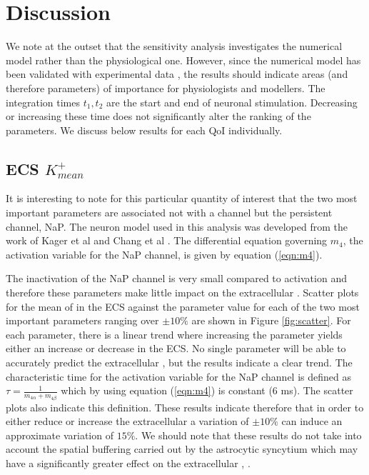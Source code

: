 \section{Discussion}
We  note at the outset that the sensitivity analysis investigates the numerical model rather than the physiological one. However, since the numerical model has been validated with experimental data  \cite{Dormanns2015,Mathias2018},  the results should indicate areas (and therefore parameters) of importance for physiologists and modellers. The integration times $t_1,t_2$ are the start and end of neuronal stimulation. Decreasing or increasing these time does not significantly alter the ranking of the parameters. We discuss below results for each QoI individually. 


\subsection{ECS $K^+_{mean}$}
It is interesting to note for this particular quantity of interest that the two most important parameters are associated not with a \pot channel but the persistent \na channel, NaP.  The neuron model used in this analysis was developed from the work of Kager et al \cite{Kager2000a} and Chang et al \cite{Chang2013}.
The differential equation governing $m_4$,  the activation variable for the NaP channel, is given by equation (\ref{eqn:m4}).

The inactivation of the NaP channel is very small compared to activation and therefore these parameters make little impact on the extracellular \pot. 
Scatter plots for the mean of \pot in the  ECS against the parameter value for each of the two most important parameters ranging over $\pm 10\%$  are shown in Figure \ref{fig:scatter}.  For each parameter, there is a linear trend where increasing the parameter yields either an increase or decrease in the \pot ECS. No single parameter will be able to accurately predict the extracellular \pot, but the results indicate a clear trend. The characteristic time for the activation variable for the NaP channel is defined as $\tau=\frac{1}{m_{4 \alpha}+m_{4 \beta}}$ which by using equation (\ref{eqn:m4}) is constant (6 ms). The scatter plots also indicate this definition. These results indicate therefore that in order to either reduce or increase the extracellular \pot a variation of $\pm 10 \%$ can induce an approximate variation of $15 \%$. We should note that these results do not take into account the spatial buffering carried out by the astrocytic syncytium which may have a significantly greater effect on the extracellular \pot, \cite{Bellot-Saez2017,Kenny2018b}. 

